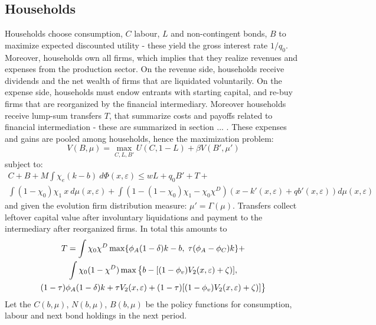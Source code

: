 \documentclass[12pt]{article}
\begin{document}
\subsection{Households}\label{sec:hh}
Households choose consumption, $C$ labour, $L$ and non-contingent bonds, $B$ to maximize expected discounted utility - these yield the gross interest rate $1/q_0$. Moreover, households own all firms, which implies that they realize revenues and expenses from the production sector. On the revenue side, households receive dividends and the net wealth of firms that are liquidated voluntarily. On the expense side, households must endow entrants with starting capital, and re-buy firms that are reorganized by the financial intermediary. Moreover households receive lump-sum transfers $T$, that summarize costs and payoffs related to financial intermediation - these are summarized in section ... . These expenses and gains are pooled among households, hence the maximization problem:
\begin{equation} \label{eq:U_max}
V(B, \mu) = \max_{C,L,B'} U(C, 1-L) + \beta V(B', \mu')
\end{equation}  
subject to: 
\begin{multline} \label{eq:const_hh}
C + B + M \int  \chi_e (k-b) \ d \Phi(x,\varepsilon)  \leq wL + q_0 B' + T + \\  \int (1 - \chi_0) \chi_1 \ x \ d \mu(x,\varepsilon) + \int (1-(1-\chi_0)\chi_1-\chi_0\chi^D) \left( x - k'(x,\varepsilon) + qb'(x,\varepsilon) \right) d \mu(x,\varepsilon)
\end{multline} 
and given the evolution firm distribution measure: $\mu' = \Gamma(\mu)$. Transfers collect leftover capital value after involuntary liquidations and payment to the intermediary after reorganized firms. In total this amounts to 
\begin{multline*} \label{eq:T}
    T = \int \chi_0\chi^D  \max \{\phi_A (1-\delta) k - b, \hspace{1mm} \tau (\phi_A-\phi_C) k  \}  + \\
    \int \chi_0(1-\chi^D) \max \big{\{}b - [(1- \phi_v) V_2 (x, \varepsilon) + \zeta)], \\ (1-\tau)\phi_A(1-\delta)k + \tau V_2 (x, \varepsilon) + (1-\tau) [(1- \phi_v) V_2 (x, \varepsilon) + \zeta)]\big{\}} 
\end{multline*} 
Let the $C(b,\mu)$, $N(b,\mu)$, $B(b,\mu)$ be the policy functions for consumption, labour and next bond holdings in the next period. 
\end{document}
